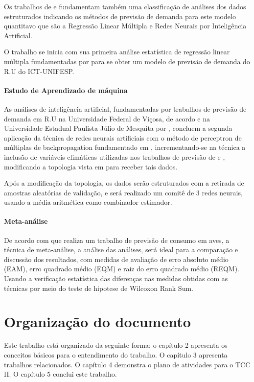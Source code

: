 \documentclass[	12pt, Times, openright, twoside, a4paper, english, brazil]{abntex2}
\begin{document}
          Os trabalhos de \cite{Junior2007} e \cite{Silva2010} fundamentam também uma classificação de análises dos dados estruturados indicando os métodos de previsão de demanda para este modelo quantitavo que são a Regressão Linear Múltipla e Redes Neurais por Inteligência Artificial.

          O trabalho se inicia com sua primeira análise estatística de regressão linear múltipla fundamentadas por \cite{Clarice2011} para se obter um modelo de previsão de demanda do R.U do ICT-UNIFESP.

        \paragraph*{Estudo de Aprendizado de máquina}
          As análises de inteligência artificial, fundamentadas por trabalhos de previsão de demanda em R.U na Universidade Federal de Viçosa, de acordo \cite{Lopes2008} e na Universidade Estadual Paulista Júlio de Mesquita por \cite{Rocha2011}, concluem a segunda aplicação da técnica de redes neurais artificiais com o método de perceptron de múltiplas de backpropagation fundamentado em \cite{Haykin1994}, incrementando-se na técnica a inclusão de variáveis climáticas utilizadas nos trabalhos de previsão de  \cite{Almeida2013} \cite{Ruas2012} e \cite{Silva2010}, modificando a topologia vista em \cite{Lopes2008} para receber tais dados. 

          Após a modificação da topologia, os dados serão estruturados com a retirada de amostras aleatórias de validação, e será realizado um comitê de 3 redes neurais, usando a média aritmética como combinador estimador.

        \paragraph*{Meta-análise}
          De acordo com \cite{Flavia2014} que realiza um trabalho de previsão de consumo em aves, a técnica de meta-análise, a análise das análises, será ideal para a comparação e discussão dos resultados, com medidas de avaliação de erro absoluto médio (EAM), erro quadrado médio (EQM) e raiz do erro quadrado médio (REQM). Usando a verificação estatística das diferenças nas medidas obtidas com as técnicas por meio do teste de hipotese de Wilcoxon Rank Sum. 

      \section{Organização do documento}
        Este trabalho está organizado da seguinte forma: o capítulo 2 apresenta os conceitos básicos para o entendimento do trabalho. O capítulo 3 apresenta trabalhos relacionados. O capítulo 4 demonstra o plano de atividades para o TCC II. O capítulo 5 conclui este trabalho.
\end{document}
